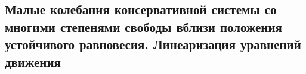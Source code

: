 

\subsection{Малые колебания консервативной системы со многими степенями свободы вблизи положения устойчивого равновесия. Линеаризация уравнений движения}



